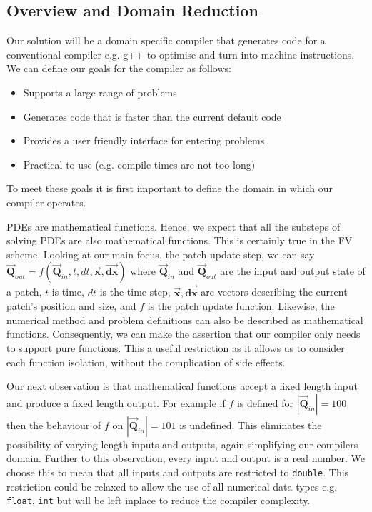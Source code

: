
\newcommand{\vecc}[1]{\vec{\mathbf{#1}}}

\subsection{Overview and Domain Reduction}
Our solution will be a domain specific compiler that generates code for a conventional compiler e.g. g++ to optimise and turn into machine instructions.
We can define our goals for the compiler as follows:
\begin{itemize}
    \item Supports a large range of problems
    \item Generates code that is faster than the current default code
    \item Provides a user friendly interface for entering problems
    \item Practical to use (e.g. compile times are not too long)
\end{itemize}
To meet these goals it is first important to define the domain in which our compiler operates.

PDEs are mathematical functions.
Hence, we expect that all the substeps of solving PDEs are also mathematical functions.
This is certainly true in the FV scheme.
Looking at our main focus, the patch update step, we can say $\vecc{Q}_{out} = f(\vecc{Q}_{in}, t, dt, \vecc{x}, \vecc{dx})$ where
$\vecc{Q}_{in}$ and $\vecc{Q}_{out}$ are the input and output state of a patch,
$t$ is time,
$dt$ is the time step,
$\vecc{x}, \vecc{dx}$ are vectors describing the current patch's position and size, and $f$ is the patch update function.
Likewise, the numerical method and problem definitions can also be described as mathematical functions. 
Consequently, we can make the assertion that our compiler only needs to support pure functions.
This a useful restriction as it allows us to consider each function isolation, without the complication of side effects.

Our next observation is that mathematical functions accept a fixed length input and produce a fixed length output.
For example if $f$ is defined for $|\vecc{Q}_{in}|=100$ then the behaviour of $f$ on $|\vecc{Q}_{in}|=101$ is undefined.  
This eliminates the possibility of varying length inputs and outputs, again simplifying our compilers domain.
Further to this observation, every input and output is a real number.
We choose this to mean that all inputs and outputs are restricted to \texttt{double}.
This restriction could be relaxed to allow the use of all numerical data types e.g. \texttt{float}, \texttt{int} but will be left inplace to reduce the compiler complexity.

